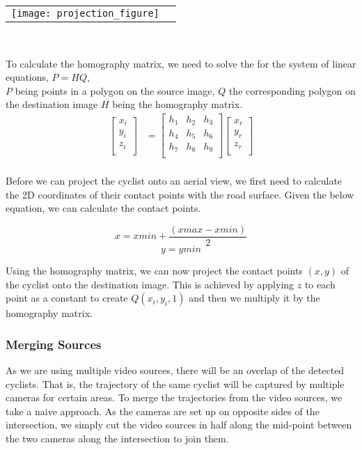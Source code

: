 \noindent
\begin{tabular}{@{}cc}
\texttt{[image: projection\_figure]} 
\end{tabular}
\label{projection_figure}
\

To calculate the homography matrix, we need to solve the for the system of linear equations, $P = HQ$,
\ \\
$P$ being points in a polygon on the source image, $Q$ the corresponding polygon on the destination image $H$ being the homography matrix.
\begin{align}
\label{eq:3}
  \begin{bmatrix}
    x_{i} \\
    y_{i} \\
    z_{i} \\
  \end{bmatrix}
  &= \begin{bmatrix}
      h_1 & h_2 & h_3 \\
      h_4 & h_5 & h_6 \\
      h_7 & h_8 & h_9 \\
  \end{bmatrix}
  \begin{bmatrix}
    x_{r} \\
    y_{r} \\
    z_{r} \\
  \end{bmatrix}
\end{align}
\ \\

Before we can project the cyclist onto an aerial view, we first need to calculate the 2D coordinates of their contact points with the road surface.
Given the below equation, we can calculate the contact points.

$$x = xmin + \frac{(xmax - xmin)}{2}$$
$$y = ymin$$

Using the homography matrix, we can now project the contact points $(x, y)$ of the cyclist onto the destination
image. This is achieved by applying $z$ to each point as a constant to create $Q(x_i, y_i, 1)$ and then we multiply it by the homography matrix. 

\subsubsection{Merging Sources}
As we are using multiple video sources, there will be an overlap of the detected cyclists. 
That is, the trajectory of the same cyclist will be captured by multiple cameras for certain areas. 
To merge the trajectories from the video sources, we take a naive approach. As the cameras are set up on
opposite sides of the intersection, we simply cut the video sources in half along the mid-point between
the two cameras along the intersection to join them.

